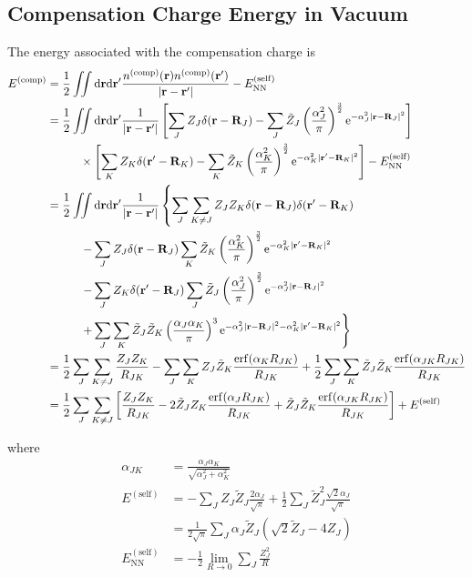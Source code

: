 \documentclass[paper=a4, fontsize=11pt]{article} %
\numberwithin{equation}{section} %
\numberwithin{figure}{section} %
\numberwithin{table}{section} %
\newcommand{\br}{{\bf{r}}}
\newcommand{\bR}{{\bf{R}}}
\newcommand{\rNN}{{\mathrm{NN}}}
\newcommand{\rself}{{\mathrm{self}}}
\newcommand{\re}{{\mathrm{e}}}
\newcommand{\rerf}{{\mathrm{erf}}}
\newcommand{\rd}{{\mathrm{d}}}
\newcommand{\rcomp}{{\mathrm{comp}}}
\newcommand{\al}{{\alpha}}
\begin{document}
\subsection{Compensation Charge Energy in Vacuum}
The energy associated with the compensation charge is
\begin{equation}
\begin{split}
E^{(\rcomp)} 
&= \frac{1}{2}\iint \rd \br \rd \br' \frac{n^{(\rcomp)}(\br)n^{(\rcomp)}(\br')}{|\br-\br'|} - E_{\rNN}^{(\rself)}\\
&= \frac{1}{2}\iint \rd \br \rd \br' \frac{1}{|\br-\br'|} \left[\sum_J Z_J\delta(\br-\bR_J) - \sum_J \tilde Z_J\left(\frac{\al_J^2}{\pi}\right)^{\frac{3}{2}}\re^{-\al_J^2|\br-\bR_J|^2}\right]\\
&\hspace{10mm}\times \left[\sum_K Z_K\delta(\br'-\bR_K) - \sum_K \tilde Z_K\left(\frac{\al_K^2}{\pi}\right)^{\frac{3}{2}}\re^{-\al_K^2|\br'-\bR_K|^2}\right] - E_{\rNN}^{(\rself)}\\
&= \frac{1}{2}\iint \rd \br \rd \br' \frac{1}{|\br-\br'|} \left\{\sum_J \sum_{K \neq J} Z_J Z_K \delta(\br-\bR_J)\delta(\br'-\bR_K) \right. \\
&\left.\hspace{10mm} - \sum_J Z_J\delta(\br-\bR_J) \sum_K \tilde Z_K\left(\frac{\al_K^2}{\pi}\right)^{\frac{3}{2}}\re^{-\al_K^2|\br'-\bR_K|^2} \right. \\
&\left.\hspace{10mm} - \sum_J Z_K\delta(\br'-\bR_J) \sum_J \tilde Z_J\left(\frac{\al_J^2}{\pi}\right)^{\frac{3}{2}}\re^{-\al_J^2|\br-\bR_J|^2} \right. \\
&\left.\hspace{10mm} + \sum_J\sum_K \tilde Z_J\tilde Z_K\left(\frac{\al_J\al_K}{\pi}\right)^3\re^{-\al_J^2|\br-\bR_J|^2-\al_K^2|\br'-\bR_K|^2}\right\}\\
&= \frac{1}{2}\sum_{J} \sum_{K \neq J} \frac{Z_JZ_{K}}{R_{JK}}  - \sum_J\sum_K Z_J \tilde Z_K \frac{\rerf(\al_{K}R_{JK})}{R_{JK}} + \frac{1}{2}\sum_J\sum_K \tilde Z_J\tilde Z_K \frac{\rerf(\al_{JK}R_{JK})}{R_{JK}} \\
&= \frac{1}{2}\sum_{J} \sum_{K \neq J} \left[\frac{Z_JZ_{K}}{R_{JK}}  - 2 \tilde Z_J  Z_K \frac{\rerf(\al_{J}R_{JK})}{R_{JK}} +  \tilde Z_J\tilde Z_K \frac{\rerf(\al_{JK}R_{JK})}{R_{JK}}\right] + E^{(\rself)} \\
\end{split}
\end{equation}

where
\begin{equation}
\begin{split}
\al_{JK}
&= \frac{\al_J\al_K}{\sqrt{\al_J^2+\al_K^2}}\\
E^{(\rself)} 
&= -\sum_J  Z_J \tilde Z_J \frac{2\al_J}{\sqrt{\pi}} + \frac{1}{2}\sum_J \tilde Z_J^2 \frac{\sqrt{2}\al_J}{\sqrt{\pi}}\\
&= \frac{1}{2\sqrt{\pi}}\sum_J \al_J \tilde Z_J (\sqrt{2}\tilde Z_J - 4Z_J)\\
E_{\rNN}^{(\rself)}
&= -\frac{1}{2}\lim_{R \rightarrow 0}\sum_J \frac{Z_J^2}{R}
\end{split}
\end{equation}
\end{document}
